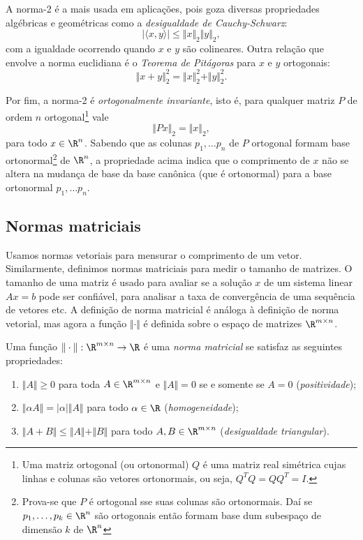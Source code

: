 \documentclass{article}
\begin{document}
A norma-2 é a mais usada em aplicações, pois goza diversas propriedades algébricas e geométricas como a \emph{desigualdade de Cauchy-Schwarz}:
\[
    |\langle x, y \rangle| \leq \Vert x \Vert_2 \Vert y \Vert_2,
\]
com a igualdade ocorrendo quando \(x\) e \(y\) são colineares. Outra relação que envolve a norma euclidiana é o \emph{Teorema de Pitágoras} para \(x\) e \(y\) ortogonais:
\[
    \Vert x + y \Vert_2^2 = \Vert x \Vert_2^2 + \Vert y \Vert_2^2.
\]

Por fim, a norma-2 é \emph{ortogonalmente invariante}, isto é, para qualquer matriz \(P\) de ordem \(n\) ortogonal\footnote{Uma matriz ortogonal (ou ortonormal) \(Q\) é uma matriz real simétrica cujas linhas e colunas são vetores ortonormais, ou seja, \(Q^T Q = Q Q^T = I\).} vale
\[
    \Vert Px \Vert_2 = \Vert x \Vert_2,
\]
para todo \(x \in \R^n\). Sabendo que as colunas \(p_1, \ldots p_n\) de \(P\) ortogonal formam base ortonormal\footnote{Prova-se que \(P\) é ortogonal sse suas colunas são ortonormais. Daí se \(p_1, \ldots, p_k \in \R^n\) são ortogonais então formam base dum subespaço de dimensão \(k\) de \(\R^n\)} de \(\R^n\), a propriedade acima indica que o comprimento de \(x\) não se altera na mudança de base da base canônica (que é ortonormal) para a base ortonormal \(p_1, \ldots p_n\).

\subsection{Normas matriciais}

Usamos normas vetoriais para mensurar o comprimento de um vetor. Similarmente, definimos normas matriciais para medir o tamanho de matrizes. O tamanho de uma matriz é usado para avaliar se a solução \(x\) de um sistema linear \(Ax = b\) pode ser confiável, para analisar a taxa de convergência de uma sequência de vetores etc. A definição de norma matricial é análoga à definição de norma vetorial, mas agora a função \(\Vert \cdot \Vert\) é definida sobre o espaço de matrizes \(\R^{m \times n}\).

\begin{defn}
    Uma função \(\Vert \cdot \Vert : \R^{m \times n} \to \R\) é uma \emph{norma matricial} se satisfaz as seguintes propriedades:
    \begin{enumerate}
        \item \(\Vert A \Vert \geq 0\) para toda \(A \in \R^{m \times n}\) e \(\Vert A \Vert = 0\) se e somente se \(A = 0\) (\emph{positividade});
        \item \(\Vert \alpha A \Vert = |\alpha| \Vert A \Vert\) para todo \(\alpha \in \R\) (\emph{homogeneidade});
        \item \(\Vert A + B \Vert \leq \Vert A \Vert + \Vert B \Vert\) para todo \(A, B \in \R^{m \times n}\) (\emph{desigualdade triangular}).
    \end{enumerate}
\end{defn}
\end{document}
